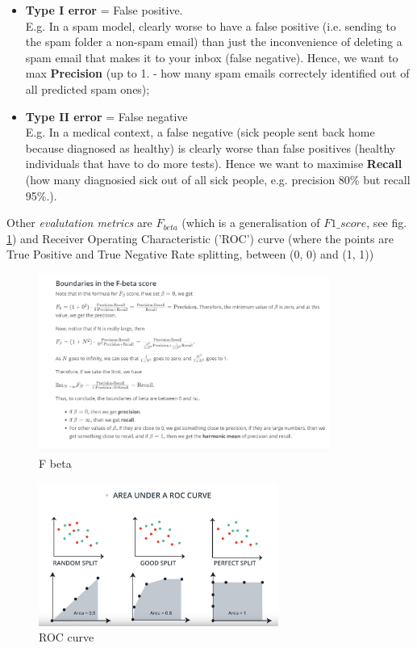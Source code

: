 \documentclass[12pt]{article}
\begin{document}
\begin{itemize}
	\item \textbf{Type I error} = False positive. \\ E.g. In a spam model, clearly worse to have a false positive (i.e. sending to the spam folder a non-spam email) than just the inconvenience of deleting a spam email that makes it to your inbox (false negative). Hence, we want to max \textbf{Precision} (up to 1. - how many spam emails correctely identified out of all predicted spam ones);
	\item \textbf{Type II error} = False negative \\ E.g. In a medical context, a false negative (sick people sent back home because diagnosed as healthy) is clearly worse than false positives (healthy individuals that have to do more tests). Hence we want to maximise \textbf{Recall} (how many diagnosied sick out of all sick people, e.g. precision 80\% but recall 95\%.).
\end{itemize}

Other \textit{evalutation metrics} are $F_{beta}$ (which is a generalisation of  $F1\_score$, see fig. \ref{F_beta_boundaries}) and Receiver Operating Characteristic ('ROC') curve (where the points are True Positive and True Negative Rate splitting, between (0, 0) and (1, 1))
\begin{figure}[htbp] 
	\centering
	\includegraphics[width=0.85\textwidth]{pics/F_beta_boundaries}
	\caption{F beta}  
	\label{F_beta_boundaries}
\end{figure}

\begin{figure}[htbp] 
	\centering
	\includegraphics[width=0.7\textwidth]{pics/ROC_curve}
	\caption{ROC curve}  
	\label{ROC_curve}
\end{figure}
\end{document}

